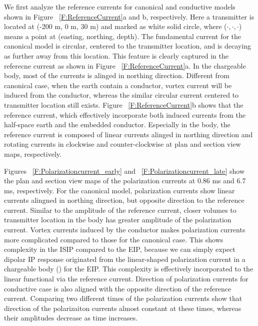 \documentclass[a4paper, 11pt]{article}
\begin{document}
We first analyze the reference currents for canonical and conductive models shown in Figure ~\ref{F:ReferenceCurrent}a and b, respectively. 
Here a transmitter is located at (-200 m, 0 m, 30 m) and marked as white solid circle, where ($\cdot, \cdot, \cdot$) means a point at (easting, northing, depth).  
The fundamental current for the canonical model is circular, centered to the transmitter location, and is decaying as further away from this location. This feature is clearly captured in the referecne current as shown in Figure ~\ref{F:ReferenceCurrent}a. 
In the chargeable body, most of the currents is alinged in northing direction. 
Different from canonical case, when the earth contain a conductor, vortex current will be induced from the conductor, whereas the similar circular current centered to transmitter location still exists.  
Figure ~\ref{F:ReferenceCurrent}b shows that the reference current, which effectively incorporate both induced currents from the half-space earth and the embedded conductor.  
Especially in the body, the reference current is composed of linear currents alinged in northing direction and rotating currents in clockwise and counter-clockwise at plan and section view maps, respectively. 

Figures ~\ref{F:Polarizationcurrent_early} and ~\ref{F:Polarizationcurrent_late} show the plan and section view maps of the polarization currents at 0.86 ms and 6.7 ms, respectively. 
For the canonical model, polarization currents show linear currents alingned in northing direction, but opposite direction to the reference current. 
Similar to the amplitude of the reference current, closer volumes to transmitter location in the body has greater amplitude of the polarization current. 
Vortex currents induced by the conductor makes polarization currents more complicated compared to those for the canonical case. 
This shows complexity in the ISIP compared to the EIP, because we can simply expect dipolar IP response originated from the linear-shaped polarization current in a chargeable body (\cite{seigel1959}) for the EIP.
This complexity is effectively incorporated to the linear functional via the reference current. 
Direction of polarization currents for conductive case is also aligned with the opposite direction of the reference current.
Comparing two different times of the polarization currents show that direction of the polarizaiton currents almost constant at these times, whereas their amplitudes decrease as time increases. 
\end{document}
